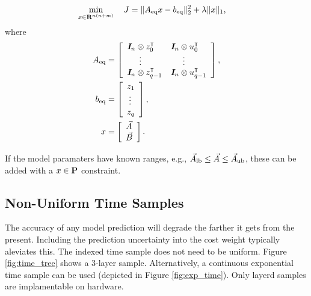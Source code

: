 \documentclass{article}
\begin{document}
    \begin{align*}
        \min_{x\in\textbf{R}^{n(n+m)}}\quad J
        &=
        \|A_{\text{eq}} x-b_{\text{eq}}\|_2^2+\lambda\| x\|_1,
    \end{align*}
    where
    \begin{align*}
        A_{\text{eq}}&= \left[\begin{array}{ll}
            \emph{\textbf{I}}_n\otimes z_0^\intercal & \emph{\textbf{I}}_n\otimes u_0^\intercal\\
            \quad\:\:\vdots&\quad\:\:\vdots\\
            \emph{\textbf{I}}_n\otimes z_{q-1}^\intercal & \emph{\textbf{I}}_n\otimes u_{q-1}^\intercal\\
        \end{array}\right],\\
        b_{\text{eq}}&=
        \left[\begin{array}{l}
            z_1\\
            \:\vdots\\
            z_q
        \end{array}\right],\\
        x &= \left[\begin{array}{l}
            \vec{A}
            \\
            \vec{B}
        \end{array}\right].
    \end{align*}


    If the model paramaters have known ranges, e.g., 
    $\vec{A}_{\text{lb}}\leq\vec{A}\leq\vec{A}_{\text{ub}}$,
    these can be added with a $x\in\textbf{P}$ constraint.

    \subsection{Non-Uniform Time Samples}

    The accuracy of any model prediction will
    degrade the farther it gets from the present.
    Including the prediction uncertainty into the cost weight typically aleviates this.
    The indexed time sample does not need to be uniform.
    Figure \ref{fig:time_tree} shows a 3-layer sample.  Alternatively,
    a continuous exponential time sample can be used (depicted in Figure \ref{fig:exp_time}).
    Only layerd samples are implamentable on hardware.
\end{document}
